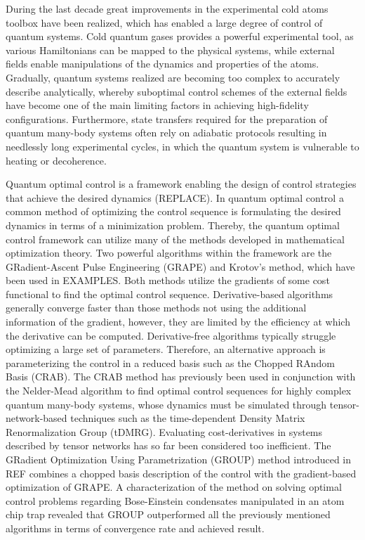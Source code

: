 \documentclass[%
 reprint,
 amsmath,amssymb,
 aps,
pra,
]{revtex4-1}
\begin{document}
During the last decade great improvements in the experimental cold atoms toolbox have been realized, which has enabled a large degree of control  of quantum systems. Cold quantum gases provides a powerful experimental tool, as various Hamiltonians can be mapped to the physical systems, while external fields enable manipulations of the dynamics and properties of the atoms. Gradually, quantum systems realized are becoming too complex to accurately describe analytically, whereby suboptimal control schemes of the external fields have become one of the main limiting factors in achieving high-fidelity configurations. Furthermore, state transfers required for the preparation of quantum many-body systems often rely on adiabatic protocols resulting in needlessly long experimental cycles, in which the quantum system is vulnerable to heating or decoherence.

Quantum optimal control is a framework enabling the design of control strategies that achieve the desired dynamics (REPLACE). 
In quantum optimal control a common method of optimizing the control sequence is formulating the desired dynamics in terms of a minimization problem. Thereby, the quantum optimal control framework can utilize many of the methods developed in mathematical optimization theory. Two powerful algorithms within the framework are the GRadient-Ascent Pulse Engineering (GRAPE) and Krotov's method, which have been used in EXAMPLES. Both methods utilize the gradients of some cost functional to find the optimal control sequence. Derivative-based algorithms generally converge faster than those methods not using the additional information of the gradient, however, they are limited by the efficiency at which the derivative can be computed. 
Derivative-free algorithms typically struggle optimizing a large set of parameters. Therefore, an alternative approach is parameterizing the control in a reduced basis such as the Chopped RAndom Basis (CRAB). The CRAB method has previously been used in conjunction with the Nelder-Mead algorithm to find optimal control sequences for highly complex quantum many-body systems, whose dynamics must be simulated through tensor-network-based techniques such as the time-dependent Density Matrix Renormalization Group (tDMRG). Evaluating cost-derivatives in systems described by tensor networks has so far been considered too inefficient.
The GRadient Optimization Using Parametrization (GROUP) method introduced in REF combines a chopped basis description of the control with the gradient-based optimization of GRAPE. A characterization of the method on solving optimal control problems regarding Bose-Einstein condensates manipulated in an atom chip trap revealed that GROUP outperformed all the previously mentioned algorithms in terms of convergence rate and achieved result. 
\end{document}
